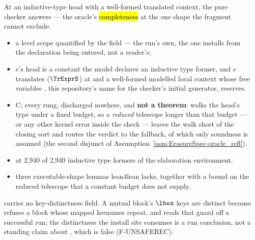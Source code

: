 \begin{assumption}
\label{asm:EraserAsks-kernel_ind_head_true}
\leanok
{}
\stAssumed{}  At an inductive-type head with a well-formed translated context, the
pure checker answers  --- the oracle's \hl{completeness} at the one shape the fragment
cannot exclude.
\begin{itemize}
\item {} a level scope  quantified by the field --- the run's own, the one
 installs from the declaration being entered, not a reader's;
\item $e$'s head is a constant the model declares an inductive type former, and $e$ translates
($\TrExprS$) at  and a well-formed modelled local context whose free variables
, this repository's name for the checker's initial generator, reserves.
\item {} C;  every rung, discharged nowhere, and \textbf{not a
theorem}:  walks the head's type under a fixed budget, so a \emph{reduced}
telescope longer than that budget --- or any other kernel error inside the check --- leaves the
walk short of the closing sort and routes the verdict to the  fallback, of which only
soundness is assumed (the second disjunct of Assumption~\ref{asm:ErasureSpec-oracle_refl}).
\item {}  at 2{,}940 of 2{,}940 inductive type formers of the
elaboration environment.
\item {} three executable-shape lemmas lean4lean lacks, together with
a bound on the reduced telescope that a constant budget does not supply.
\end{itemize}
\end{assumption}

\begin{remark}
  carries no key-distinctness field. A mutual block's $\lbox$ keys are
distinct because  refuses a block whose mapped kernames repeat, and
 reads that guard off a successful run; the distinctness the
install site consumes is a run conclusion, not a standing claim about
, which is false (F-UNSAFEREC).
\end{remark}

